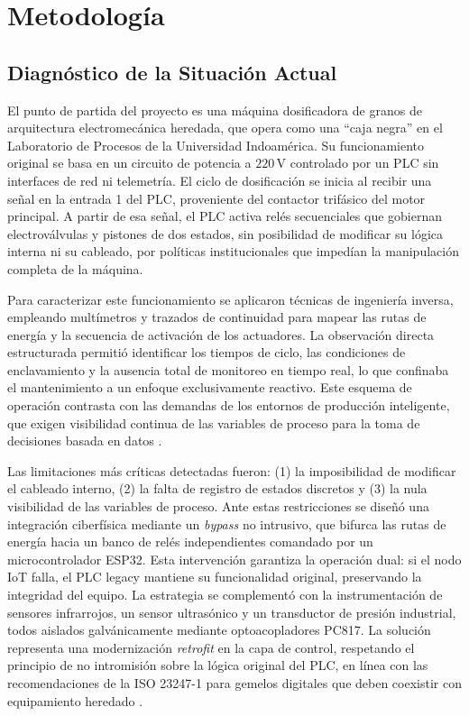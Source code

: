 \chapter{Metodología}
\label{chap:metodologia}

\section{Diagnóstico de la Situación Actual}
El punto de partida del proyecto es una máquina dosificadora de granos de arquitectura electromecánica heredada, que opera como una ``caja negra'' en el Laboratorio de Procesos de la Universidad Indoamérica. Su funcionamiento original se basa en un circuito de potencia a $220\,\text{V}$ controlado por un PLC sin interfaces de red ni telemetría. El ciclo de dosificación se inicia al recibir una señal en la entrada 1 del PLC, proveniente del contactor trifásico del motor principal. A partir de esa señal, el PLC activa relés secuenciales que gobiernan electroválvulas y pistones de dos estados, sin posibilidad de modificar su lógica interna ni su cableado, por políticas institucionales que impedían la manipulación completa de la máquina.

Para caracterizar este funcionamiento se aplicaron técnicas de ingeniería inversa, empleando multímetros y trazados de continuidad para mapear las rutas de energía y la secuencia de activación de los actuadores. La observación directa estructurada permitió identificar los tiempos de ciclo, las condiciones de enclavamiento y la ausencia total de monitoreo en tiempo real, lo que confinaba el mantenimiento a un enfoque exclusivamente reactivo. Este esquema de operación contrasta con las demandas de los entornos de producción inteligente, que exigen visibilidad continua de las variables de proceso para la toma de decisiones basada en datos \cite{retrofitting2025}.

Las limitaciones más críticas detectadas fueron: (1) la imposibilidad de modificar el cableado interno, (2) la falta de registro de estados discretos y (3) la nula visibilidad de las variables de proceso. Ante estas restricciones se diseñó una integración ciberfísica mediante un \textit{bypass} no intrusivo, que bifurca las rutas de energía hacia un banco de relés independientes comandado por un microcontrolador ESP32. Esta intervención garantiza la operación dual: si el nodo IoT falla, el PLC legacy mantiene su funcionalidad original, preservando la integridad del equipo. La estrategia se complementó con la instrumentación de sensores infrarrojos, un sensor ultrasónico y un transductor de presión industrial, todos aislados galvánicamente mediante optoacopladores PC817. La solución representa una modernización \textit{retrofit} en la capa de control, respetando el principio de no intromisión sobre la lógica original del PLC, en línea con las recomendaciones de la ISO 23247-1 para gemelos digitales que deben coexistir con equipamiento heredado \cite{iso23247-1}.

